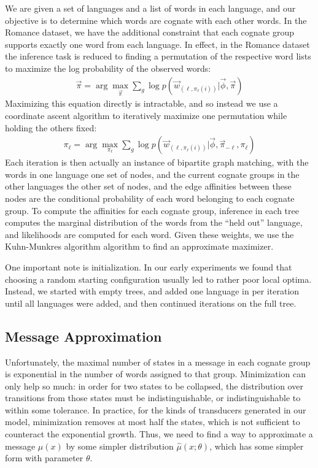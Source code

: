 \documentclass[11pt,a4paper]{article}
\begin{document}
We are given a set of languages and a list of words
in each language, and our objective is to determine which words are
cognate with each other words. In the Romance dataset, we have the
additional constraint that each cognate group supports exactly one
word from each language. In effect, in the Romance dataset the 
inference task is reduced to finding a permutation of the respective
word lists to maximize the log probability of the observed words:
\begin{equation}
  \begin{split}
    \vec{\pi} = \arg\!\max_{\vec \pi} \sum_{g} \log p(\vec w_{(\ell,\pi_\ell(i))}|\vec \phi,\vec \pi)
   \end{split}
 \end{equation}
Maximizing this equation directly is intractable, and so instead
we use a coordinate ascent algorithm to iteratively maximize one
permutation while holding the others fixed:
\begin{equation}
  \begin{split}
    \pi_\ell = \arg\!\max_{\pi_\ell} \sum_{g} \log p(\vec w_{(\ell,\pi_\ell(i))}|\vec \phi,\vec \pi_{-\ell},\pi_\ell)
  \end{split}
\end{equation}
Each iteration is then actually an instance of bipartite graph
matching, with the words in one language one set of nodes, and the
current cognate groups in the other languages the other set of
nodes, and the edge affinities between these nodes are the conditional
probability of each word belonging to each cognate group. To compute
the affinities for each cognate group, inference in each tree
computes the marginal distribution of the words from the ``held
out'' language, and likelihoods are computed for each word.  Given
these weights, we use the Kuhn-Munkres algorithm \cite{Kuhn1955} algorithm
to find an approximate maximizer.

One important note is initialization. In our early experiments we
found that choosing a random starting configuration usually led to
rather poor local optima. Instead, we started with empty trees, and
added one language in per iteration until all languages were added,
and then continued iterations on the full tree.

\subsection{Message Approximation}
\label{sec:approx}

Unfortunately, the maximal number of states in a message in each
cognate group is exponential in the number of words assigned to
that group. Minimization can only help so much: in order for two
states to be collapsed, the distribution over transitions from those
states must be indistinguishable, or indistinguishable to within
some tolerance. In practice, for the kinds of transducers generated
in our model, minimization removes at most half the states, which
is not sufficient to counteract the exponential growth. Thus, we
need to find a way to approximate a message $\mu(x)$ by some simpler
distribution $\hat\mu(x;\theta)$, which has some simpler form with
parameter $\theta$.
\end{document}
